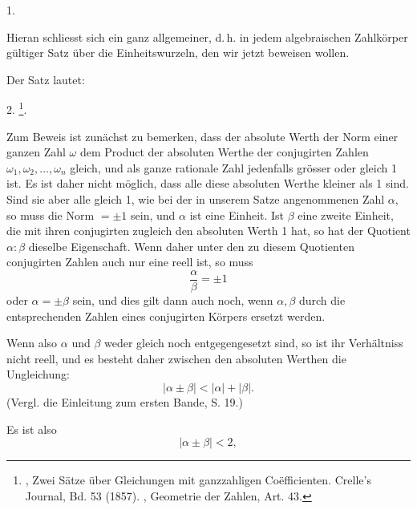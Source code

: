 1. 

Hieran schliesst sich ein ganz allgemeiner, d.\,h. in jedem
algebraischen Zahlkörper gültiger Satz über die Einheitswurzeln,
den wir jetzt beweisen wollen.

Der Satz lautet:

2. \footnote{, \glqq Zwei Sätze über Gleichungen mit ganzzahligen
Co\"efficienten\grqq. Crelle's Journal, Bd. 53 (1857). , \glqq Geometrie
der Zahlen\grqq, Art. 43.}.

Zum Beweis ist zunächst zu bemerken, dass der absolute
Werth der Norm einer ganzen Zahl $\omega$ dem Product der absoluten
Werthe der conjugirten Zahlen $\omega_1, \omega_2, \dots, \omega_n$ gleich, und als
ganze rationale Zahl jedenfalls grösser oder gleich 1 ist. Es ist
daher nicht möglich, dass alle diese absoluten Werthe kleiner
als 1 sind. Sind sie aber alle gleich 1, wie bei der in unserem
Satze angenommenen Zahl $\alpha$, so muss die Norm $= \pm 1$ sein,
und $\alpha$ ist eine Einheit. Ist $\beta$ eine zweite Einheit, die mit ihren
conjugirten zugleich den absoluten Werth 1 hat, so hat der
Quotient $\alpha : \beta$ dieselbe Eigenschaft. Wenn daher unter den zu
diesem Quotienten conjugirten Zahlen auch nur eine reell ist,
so muss
\[ \frac{\alpha}{\beta} = \pm 1 \]
oder $\alpha = \pm \beta$ sein, und dies gilt dann auch noch, wenn $\alpha, \beta$
durch die entsprechenden Zahlen eines conjugirten Körpers
ersetzt werden.

Wenn also $\alpha$ und $\beta$ weder gleich noch entgegengesetzt sind,
so ist ihr Verhältniss nicht reell, und es besteht daher zwischen
den absoluten Werthen die Ungleichung:
\[ |\alpha \pm \beta| < |\alpha| + |\beta|. \]
(Vergl. die Einleitung zum ersten Bande, S. 19.)

Es ist also
\[ |\alpha \pm \beta| < 2, \]
